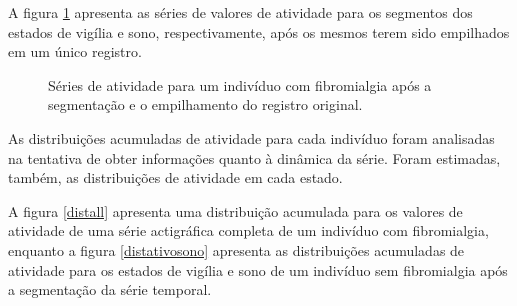 \documentclass{ufscThesis}
\begin{document}
A figura \ref{serieall} apresenta as séries de valores de atividade para os segmentos dos estados de vigília e sono, respectivamente, após os mesmos terem sido empilhados em um único registro.
 
\begin{figure}[!h]
\center
{}
\quad
{}
\caption{Séries de atividade para um indivíduo com fibromialgia após a segmentação e o empilhamento do registro original.}
\label{serieall}
\end{figure} 
 
 
As distribuições acumuladas de atividade para cada indivíduo foram analisadas na tentativa de obter informações quanto à dinâmica da série. Foram estimadas, também, as distribuições de atividade em cada estado.\par
A figura \ref{distall} apresenta uma distribuição acumulada para os valores de atividade de uma série actigráfica completa de um indivíduo com fibromialgia, enquanto a figura \ref{distativosono} apresenta as distribuições acumuladas de atividade para os estados de vigília e sono de um indivíduo sem fibromialgia após a segmentação da série temporal.
\end{document}
